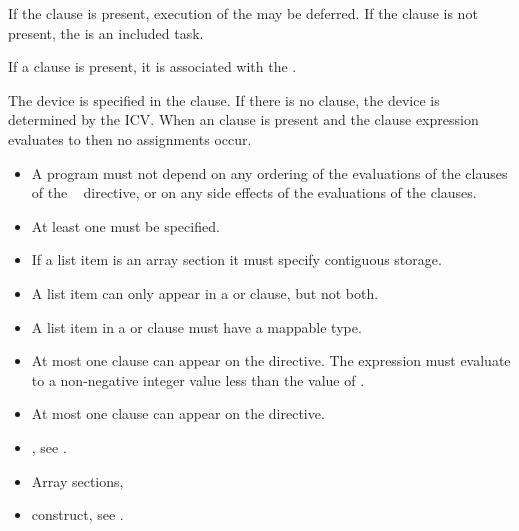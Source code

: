 {{{{If the  clause is present, execution of the  may be deferred.  If the  clause is not present, the  is an included task.

If a  clause is present, it is associated with the .

The device is specified in the  clause. If there is no  clause, the device 
is determined by the  ICV. When an  clause is present and the  
clause expression evaluates to  then no assignments occur.

\restrictions
\begin{itemize}
\item A program must not depend on any ordering of the evaluations of the clauses of the 
~ directive, or on any side effects of the evaluations of the clauses. 

\item At least one  must be specified.

\item If a list item is an array section it must specify contiguous storage. 

\item A list item can only appear in a  or  clause, but not both.

\item A list item in a  or  clause must have a mappable type.

\item At most one  clause can appear on the directive. The  expression
      must evaluate to a non-negative integer value less than the value
      of .

\item At most one  clause can appear on the directive. 
\end{itemize}

\crossreferences
\begin{itemize}
\item {}, see 
.

\item Array sections, 

\item {} construct, see 
.


\end{itemize}}}}}

